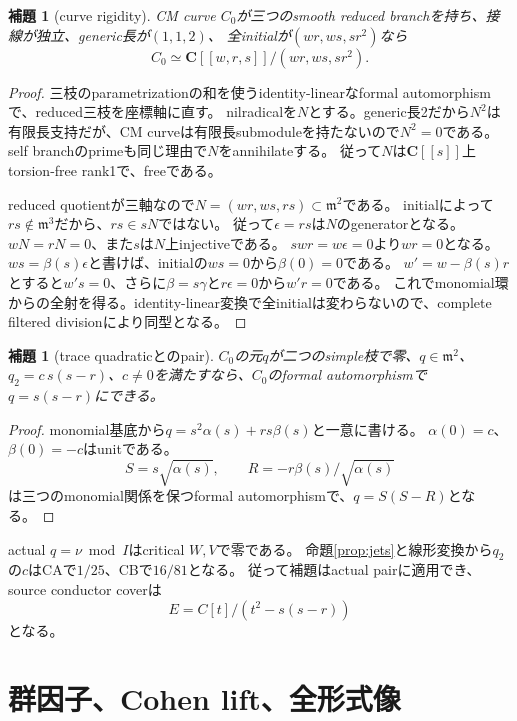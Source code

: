 \documentclass[11pt,a4paper]{ltjsarticle}
\newcommand{\CC}{\mathbf C}
\newtheorem{lemma}[theorem]{補題}
\theoremstyle{definition}
\theoremstyle{remark}
\begin{document}
\begin{lemma}[curve rigidity]\label{lem:rigid}
CM curve $C_0$が三つのsmooth reduced branchを持ち、接線が独立、generic長が$(1,1,2)$、
全initialが$(wr,ws,sr^2)$なら
\[
 C_0\simeq\CC[[w,r,s]]/(wr,ws,sr^2).
\]
\end{lemma}
\begin{proof}
三枝のparametrizationの和を使うidentity-linearなformal automorphismで、reduced三枝を座標軸に直す。
nilradicalを$N$とする。generic長2だから$N^2$は有限長支持だが、CM curveは有限長submoduleを持たないので$N^2=0$である。
self branchのprimeも同じ理由で$N$をannihilateする。
従って$N$は$\CC[[s]]$上torsion-free rank1で、freeである。

reduced quotientが三軸なので$N=(wr,ws,rs)\subset\mathfrak m^2$である。
initialによって$rs\notin\mathfrak m^3$だから、$rs\in sN$ではない。
従って$\epsilon=rs$は$N$のgeneratorとなる。
$wN=rN=0$、また$s$は$N$上injectiveである。
$swr=w\epsilon=0$より$wr=0$となる。
$ws=\beta(s)\epsilon$と書けば、initialの$ws=0$から$\beta(0)=0$である。
$w'=w-\beta(s)r$とすると$w's=0$、さらに$\beta=s\gamma$と$r\epsilon=0$から$w'r=0$である。
これでmonomial環からの全射を得る。identity-linear変換で全initialは変わらないので、complete filtered divisionにより同型となる。
\end{proof}

\begin{lemma}[trace quadraticとのpair]\label{lem:pair}
$C_0$の元$q$が二つのsimple枝で零、$q\in\mathfrak m^2$、
$q_2=c\,s(s-r)$、$c\ne0$を満たすなら、$C_0$のformal automorphismで$q=s(s-r)$にできる。
\end{lemma}
\begin{proof}
monomial基底から$q=s^2\alpha(s)+rs\beta(s)$と一意に書ける。
$\alpha(0)=c$、$\beta(0)=-c$はunitである。
\[
 S=s\sqrt{\alpha(s)},\qquad R=-r\beta(s)/\sqrt{\alpha(s)}
\]
は三つのmonomial関係を保つformal automorphismで、$q=S(S-R)$となる。
\end{proof}

actual $q=\nu\bmod I$はcritical $W,V$で零である。
命題\ref{prop:jets}と線形変換から$q_2$の$c$はCAで$1/25$、CBで$16/81$となる。
従って補題はactual pairに適用でき、source conductor coverは
\begin{equation}\label{eq:cover}
 E=C[t]/(t^2-s(s-r))
\end{equation}
となる。

\section{群因子、Cohen lift、全形式像}
\end{document}
